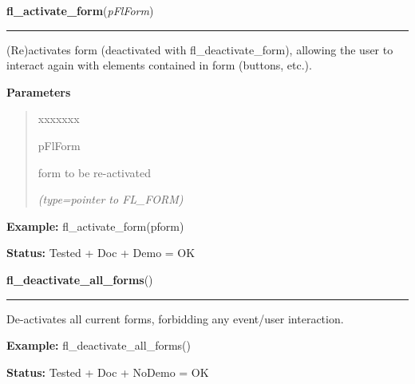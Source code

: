 \hspace{.8\funcindent}\begin{boxedminipage}{\funcwidth}

    \raggedright \textbf{fl\_activate\_form}(\textit{pFlForm})

    \vspace{-1.5ex}

    \rule{\textwidth}{0.5\fboxrule}
\setlength{\parskip}{2ex}
    (Re)activates form (deactivated with fl\_deactivate\_form), allowing 
    the user to interact again with elements contained in form (buttons, 
    etc.).

\setlength{\parskip}{1ex}
      \textbf{Parameters}
      \vspace{-1ex}

      \begin{quote}
        \begin{Ventry}{xxxxxxx}

          \item[pFlForm]

          form to be re-activated

            {\it (type=pointer to FL\_FORM)}

        \end{Ventry}

      \end{quote}

\textbf{Example:} fl\_activate\_form(pform)



\textbf{Status:} Tested + Doc + Demo = OK



    \end{boxedminipage}

    \label{xformslib:flbasic:fl_deactivate_all_forms}

    \vspace{0.5ex}

\hspace{.8\funcindent}\begin{boxedminipage}{\funcwidth}

    \raggedright \textbf{fl\_deactivate\_all\_forms}()

    \vspace{-1.5ex}

    \rule{\textwidth}{0.5\fboxrule}
\setlength{\parskip}{2ex}
    De-activates all current forms, forbidding any event/user interaction.

\setlength{\parskip}{1ex}
\textbf{Example:} fl\_deactivate\_all\_forms()



\textbf{Status:} Tested + Doc + NoDemo = OK



    \end{boxedminipage}


